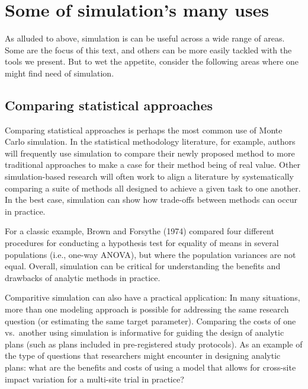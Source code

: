 \documentclass[
]{book}
\begin{document}
\hypertarget{some-of-simulations-many-uses}{%
\section{Some of simulation's many uses}\label{some-of-simulations-many-uses}}

As alluded to above, simulation is can be useful across a wide range of areas.
Some are the focus of this text, and others can be more easily tackled with the tools we present.
But to wet the appetite, consider the following areas where one might find need of simulation.

\hypertarget{comparing-statistical-approaches}{%
\subsection{Comparing statistical approaches}\label{comparing-statistical-approaches}}

Comparing statistical approaches is perhaps the most common use of Monte Carlo simulation.
In the statistical methodology literature, for example, authors will frequently use simulation to compare their newly proposed method to more traditional approaches to make a case for their method being of real value.
Other simulation-based research will often work to align a literature by systematically comparing a suite of methods all designed to achieve a given task to one another.
In the best case, simulation can show how trade-offs between methods can occur in practice.

For a classic example, Brown and Forsythe (1974) compared four different procedures for conducting a hypothesis test for equality of means in several populations (i.e., one-way ANOVA), but where the population variances are not equal.
Overall, simulation can be critical for understanding the benefits and drawbacks of analytic methods in practice.

Comparitive simulation can also have a practical application: In many situations, more than one modeling approach is possible for addressing the same research question (or estimating the same target parameter).
Comparing the costs of one vs.~another using simulation is informative for guiding the design of analytic plans (such as plans included in pre-registered study protocols).
As an example of the type of questions that researchers might encounter in designing analytic plans: what are the benefits and costs of using a model that allows for cross-site impact variation for a multi-site trial in practice?
\end{document}
